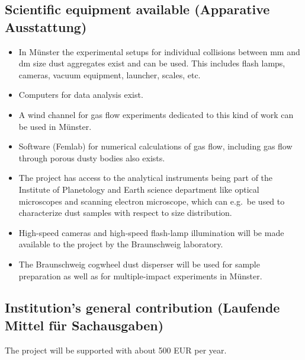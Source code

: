 \subsection{Scientific equipment available (Apparative Ausstattung)}
%
%
\begin{itemize}
\item In M\"unster the experimental setups for individual collisions between mm and dm size
dust aggregates exist and can be used. This includes flash lamps, cameras, vacuum equipment, launcher,
scales, etc.

\item Computers for data analysis exist.

\item A wind channel for gas flow experiments dedicated to this kind of work can be used in
M\"unster.

\item Software (Femlab) for numerical calculations of gas flow, including gas
flow through porous dusty bodies also exists.

\item The project has access to the analytical instruments being part of the Institute
of Planetology and Earth science department like optical microscopes and scanning
electron microscope, which can e.g.\ be used to characterize dust samples with respect
to size distribution.

\item High-speed cameras and high-speed flash-lamp illumination
will be made available to the project by the Braunschweig
laboratory.

\item The Braunschweig cogwheel dust disperser will be used for
sample preparation as well as for multiple-impact experiments in
M\"unster.

\end{itemize}


\subsection{Institution's general contribution (Laufende Mittel f\"ur Sachausgaben)}
%
%

The project will be supported with about 500 EUR per year.



